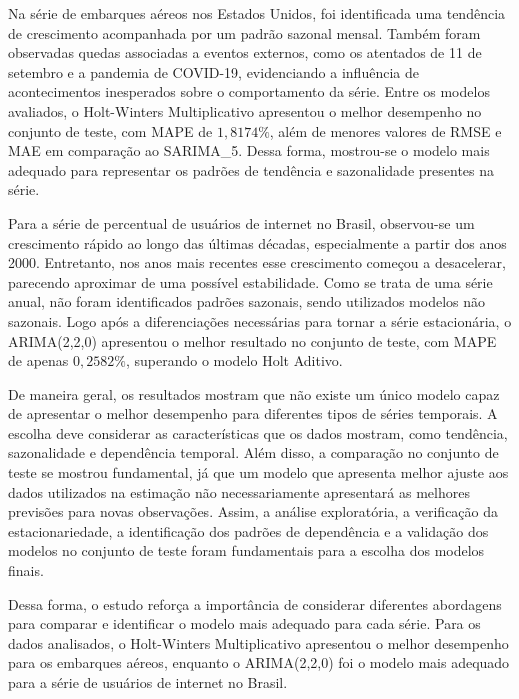 \documentclass[12pt, a4paper]{article}
\begin{document}
Na série de embarques aéreos nos Estados Unidos, foi identificada uma tendência de crescimento acompanhada por um padrão sazonal mensal. Também foram observadas quedas associadas a eventos externos, como os atentados de 11 de setembro e a pandemia de COVID-19, evidenciando a influência de acontecimentos inesperados sobre o comportamento da série. Entre os modelos avaliados, o Holt-Winters Multiplicativo apresentou o melhor desempenho no conjunto de teste, com MAPE de $1,8174\%$, além de menores valores de RMSE e MAE em comparação ao SARIMA_5. Dessa forma, mostrou-se o modelo mais adequado para representar os padrões de tendência e sazonalidade presentes na série.

Para a série de percentual de usuários de internet no Brasil, observou-se um crescimento rápido ao longo das últimas décadas, especialmente a partir dos anos 2000. Entretanto, nos anos mais recentes esse crescimento começou a desacelerar, parecendo aproximar de uma possível estabilidade. Como se trata de uma série anual, não foram identificados padrões sazonais, sendo utilizados modelos não sazonais. Logo após a diferenciações necessárias para tornar a série estacionária, o ARIMA(2,2,0) apresentou o melhor resultado no conjunto de teste, com MAPE de apenas $0,2582\%$, superando o modelo Holt Aditivo.

De maneira geral, os resultados mostram que não existe um único modelo capaz de apresentar o melhor desempenho para diferentes tipos de séries temporais. A escolha deve considerar as características que os dados mostram, como tendência, sazonalidade e dependência temporal. Além disso, a comparação no conjunto de teste se mostrou fundamental, já que um modelo que apresenta melhor ajuste aos dados utilizados na estimação não necessariamente apresentará as melhores previsões para novas observações. Assim, a análise exploratória, a verificação da estacionariedade, a identificação dos padrões de dependência e a validação dos modelos no conjunto de teste foram fundamentais para a escolha dos modelos finais.

Dessa forma, o estudo reforça a importância de considerar diferentes abordagens para comparar e identificar o modelo mais adequado para cada série. Para os dados analisados, o Holt-Winters Multiplicativo apresentou o melhor desempenho para os embarques aéreos, enquanto o ARIMA(2,2,0) foi o modelo mais adequado para a série de usuários de internet no Brasil.

\label{sec:referencias}
\end{document}

